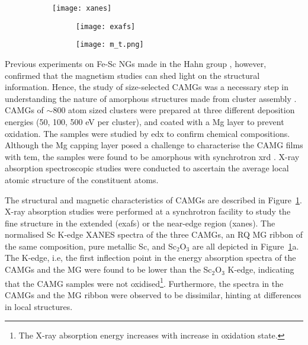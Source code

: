 \begin{figure}[!h] \centering
	\begin{subfigure}{0.5\linewidth} \centering %
		\texttt{[image: xanes]}
	\end{subfigure}%
	\hfill
	\begin{subfigure}{0.5\linewidth} \centering
		\begin{subfigure}{\linewidth} \centering
			\texttt{[image: exafs]}
		\end{subfigure}%
		\vfill
		\begin{subfigure}{\linewidth} \centering %
			\texttt{[image: m\_t.png]}
		\end{subfigure}%
	\end{subfigure}%
	
	\label{f:benel-camg}
\end{figure}

Previous experiments on Fe-Sc NGs made in the Hahn group \cite{Witte2013,Ghafari2012}, however, confirmed that the magnetism studies can shed light on the structural information. Hence, the study of size-selected \fs CAMGs was a necessary step in understanding the nature of amorphous structures made from cluster assembly \cite{Benel2019}. \fs CAMGs of $\sim$800 atom sized 
\fs clusters were prepared at three different deposition energies (50, 100, 500 eV per cluster), and coated with a Mg layer to prevent oxidation. The samples were studied by \gls{edx} to confirm chemical compositions. Although the Mg capping layer posed a challenge to characterise the CAMG films with \gls{tem}, the samples were found to be amorphous with synchrotron \gls{xrd} \cite{Benel2019}. X-ray absorption spectroscopic studies were conducted to ascertain the average local atomic structure of the constituent atoms. \par

The structural and magnetic characteristics of \fs CAMGs are described in Figure~\ref{f:benel-camg}. X-ray absorption studies were performed at a synchrotron facility to study the fine structure in the extended (\gls{exafs}) or the near-edge region (\gls{xanes}). The normalised Sc K-edge XANES spectra of the three CAMGs, an RQ MG ribbon of the same composition, pure metallic Sc, and Sc$_{2}$O$_{3}$ are all depicted in Figure~\ref{f:benel-camg}a. The K-edge, i.e, the first inflection point in the energy absorption spectra of the CAMGs and the MG were found to be lower than the Sc$_{2}$O$_{3}$ K-edge, indicating that the CAMG samples were not oxidised\footnote{The X-ray absorption energy 
increases with increase in oxidation state.}. Furthermore, the spectra in the CAMGs and the MG ribbon were observed to be dissimilar, hinting at differences in local structures. \par


